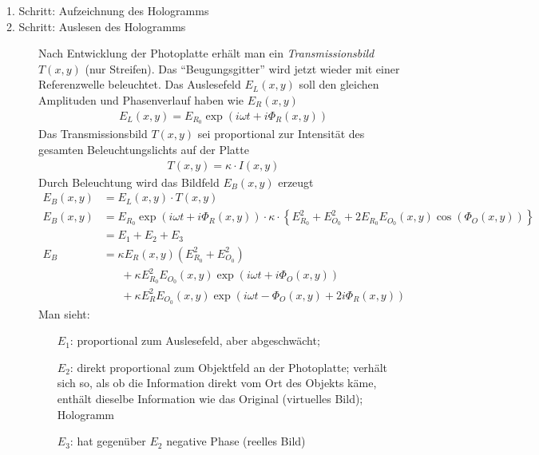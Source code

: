 
\begin{description}
\item[1. Schritt: Aufzeichnung des Hologramms]


\item[2. Schritt: Auslesen des Hologramms]
  Nach Entwicklung der Photoplatte erhält man ein
  \emph{Transmissionsbild} $T(x,y)$%
  (nur Streifen).
  Das \enquote{Beugungsgitter} wird jetzt wieder mit einer Referenzwelle
  beleuchtet.
  Das Auslesefeld $E_L(x,y)$%
  soll den gleichen Amplituden und Phasenverlauf haben wie $E_R(x,y)$
  \begin{gather*}
    E_L(x,y) = E_{R_0}\exp(i\omega t + i\Phi_R(x,y))
  \end{gather*}
  Das Transmissionsbild $T(x,y)$ sei proportional zur Intensität des
  gesamten Beleuchtungslichts auf der Platte
  \begin{gather*}
    T(x,y) = \kappa \cdot I(x,y)
  \end{gather*}
  Durch Beleuchtung wird das Bildfeld $E_B(x,y)$ 
  erzeugt
  \begin{align*}
    E_B(x,y) &= E_L(x,y) \cdot T(x,y)\\
    E_B(x,y) &= E_{R_0}\exp(i\omega t + i\Phi_R(x,y))\cdot \kappa 
               \cdot\left\{E_{R_0}^2 + E_{O_0}^2 +
               2E_{R_0}E_{O_0}(x,y)\cos(\Phi_O(x,y))\right\}\\
             &= E_1 + E_2 + E_3\\
    E_B &= \kappa E_R(x,y) \left( E_{R_0}^2 + E_{O_0}^2 \right)\\
             &\phantom{=}\; + 
               \kappa E_{R_0}^2 E_{O_0}(x,y)\exp(i\omega t + i\Phi_O(x,y))\\
             &\phantom{=}\; + 
               \kappa E_{R}^2 E_{O_0}(x,y)\exp(i\omega t-\Phi_O(x,y)+2i\Phi_R(x,y))
  \end{align*}
  Man sieht:
  \begin{itemize}
  \item[$E_1$:] proportional zum Auslesefeld, aber abgeschwächt;
  \item[$E_2$:] direkt proportional zum Objektfeld an der Photoplatte;
    verhält sich so, als ob die Information direkt vom Ort des Objekts
    käme, enthält dieselbe Information wie das Original (virtuelles
    Bild); Hologramm
  \item[$E_3$:] hat gegenüber $E_2$ negative Phase (reelles Bild)
  \end{itemize}

\end{description}

